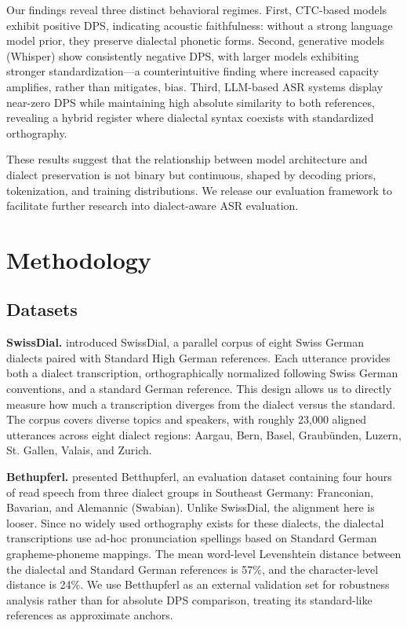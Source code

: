 \documentclass[11pt]{article}
\begin{document}
Our findings reveal three distinct behavioral regimes. First, CTC-based models exhibit positive DPS, indicating acoustic faithfulness: without a strong language model prior, they preserve dialectal phonetic forms. Second, generative models (Whisper) show consistently negative DPS, with larger models exhibiting stronger standardization—a counterintuitive finding where increased capacity amplifies, rather than mitigates, bias. Third, LLM-based ASR systems display near-zero DPS while maintaining high absolute similarity to both references, revealing a hybrid register where dialectal syntax coexists with standardized orthography.

These results suggest that the relationship between model architecture and dialect preservation is not binary but continuous, shaped by decoding priors, tokenization, and training distributions. We release our evaluation framework to facilitate further research into dialect-aware ASR evaluation.

\section{Methodology}

\subsection{Datasets}

\textbf{SwissDial.} \cite{dogan2021swissdial} introduced SwissDial, a parallel corpus of eight Swiss German dialects paired with Standard High German references. Each utterance provides both a dialect transcription, orthographically normalized following Swiss German conventions, and a standard German reference. This design allows us to directly measure how much a transcription diverges from the dialect versus the standard. The corpus covers diverse topics and speakers, with roughly 23,000 aligned utterances across eight dialect regions: Aargau, Bern, Basel, Graubünden, Luzern, St. Gallen, Valais, and Zurich.

\textbf{Bethupferl.} \cite{blaschke2025betthupferl} presented Betthupferl, an evaluation dataset containing four hours of read speech from three dialect groups in Southeast Germany: Franconian, Bavarian, and Alemannic (Swabian). Unlike SwissDial, the alignment here is looser. Since no widely used orthography exists for these dialects, the dialectal transcriptions use ad-hoc pronunciation spellings based on Standard German grapheme-phoneme mappings. The mean word-level Levenshtein distance between the dialectal and Standard German references is 57\%, and the character-level distance is 24\%. We use Betthupferl as an external validation set for robustness analysis rather than for absolute DPS comparison, treating its standard-like references as approximate anchors.
\end{document}
